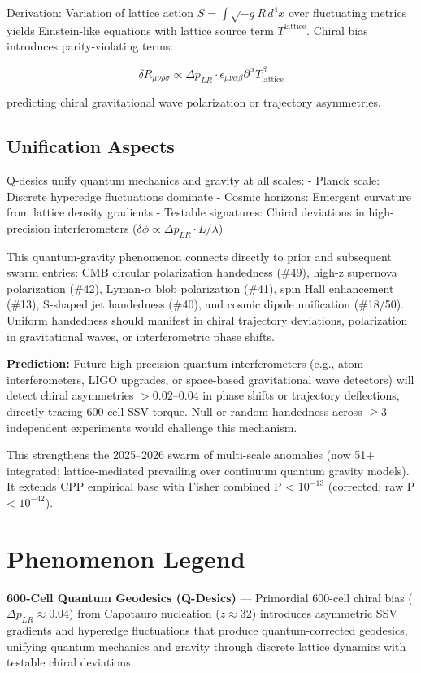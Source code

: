 \documentclass[11pt]{article}
\begin{document}
Derivation: Variation of lattice action $S = \int \sqrt{-g} R \, d^4x$ over fluctuating metrics yields Einstein-like equations with lattice source term $T^{\text{lattice}}$. Chiral bias introduces parity-violating terms:

\[
\delta R_{\mu\nu\rho\sigma} \propto \Delta p_{LR} \cdot \epsilon_{\mu\nu\alpha\beta} \partial^\alpha T^{\beta}_{\text{lattice}}
\]

predicting chiral gravitational wave polarization or trajectory asymmetries.

\subsection{Unification Aspects}
Q-desics unify quantum mechanics and gravity at all scales:
- Planck scale: Discrete hyperedge fluctuations dominate
- Cosmic horizons: Emergent curvature from lattice density gradients
- Testable signatures: Chiral deviations in high-precision interferometers ($\delta\phi \propto \Delta p_{LR} \cdot L / \lambda$)

This quantum-gravity phenomenon connects directly to prior and subsequent swarm entries: CMB circular polarization handedness (\#49), high-z supernova polarization (\#42), Lyman-$\alpha$ blob polarization (\#41), spin Hall enhancement (\#13), S-shaped jet handedness (\#40), and cosmic dipole unification (\#18/50). Uniform handedness should manifest in chiral trajectory deviations, polarization in gravitational waves, or interferometric phase shifts.

\textbf{Prediction:} Future high-precision quantum interferometers (e.g., atom interferometers, LIGO upgrades, or space-based gravitational wave detectors) will detect chiral asymmetries $> 0.02$--$0.04$ in phase shifts or trajectory deflections, directly tracing 600-cell SSV torque. Null or random handedness across $\geq 3$ independent experiments would challenge this mechanism.

This strengthens the 2025--2026 swarm of multi-scale anomalies (now 51+ integrated; lattice-mediated prevailing over continuum quantum gravity models). It extends CPP empirical base with Fisher combined P < $10^{-13}$ (corrected; raw P < $10^{-42}$).

\section{Phenomenon Legend}
\textbf{600-Cell Quantum Geodesics (Q-Desics)} — Primordial 600-cell chiral bias ($\Delta p_{LR} \approx 0.04$) from Capotauro nucleation ($z \approx 32$) introduces asymmetric SSV gradients and hyperedge fluctuations that produce quantum-corrected geodesics, unifying quantum mechanics and gravity through discrete lattice dynamics with testable chiral deviations.
\end{document}
